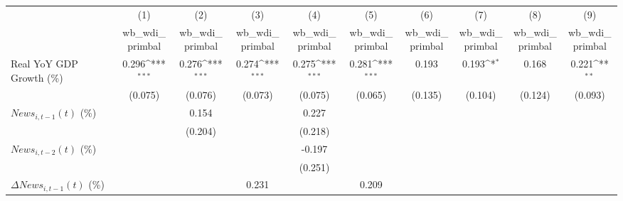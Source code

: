 {
\def\sym#1{\ifmmode^{#1}\else\(^{#1}\)\fi}
\begin{tabular}{l*{9}{c}}
\toprule
                    &\multicolumn{1}{c}{(1)}&\multicolumn{1}{c}{(2)}&\multicolumn{1}{c}{(3)}&\multicolumn{1}{c}{(4)}&\multicolumn{1}{c}{(5)}&\multicolumn{1}{c}{(6)}&\multicolumn{1}{c}{(7)}&\multicolumn{1}{c}{(8)}&\multicolumn{1}{c}{(9)}\\
                    &\multicolumn{1}{c}{wb_wdi_primbal}&\multicolumn{1}{c}{wb_wdi_primbal}&\multicolumn{1}{c}{wb_wdi_primbal}&\multicolumn{1}{c}{wb_wdi_primbal}&\multicolumn{1}{c}{wb_wdi_primbal}&\multicolumn{1}{c}{wb_wdi_primbal}&\multicolumn{1}{c}{wb_wdi_primbal}&\multicolumn{1}{c}{wb_wdi_primbal}&\multicolumn{1}{c}{wb_wdi_primbal}\\
\midrule
Real YoY GDP Growth (\%)&       0.296\sym{***}&       0.276\sym{***}&       0.274\sym{***}&       0.275\sym{***}&       0.281\sym{***}&       0.193         &       0.193\sym{*}  &       0.168         &       0.221\sym{**} \\
                    &     (0.075)         &     (0.076)         &     (0.073)         &     (0.075)         &     (0.065)         &     (0.135)         &     (0.104)         &     (0.124)         &     (0.093)         \\
\addlinespace
$ News_{i,t-1}(t)$ (\%)&                     &       0.154         &                     &       0.227         &                     &                     &                     &                     &                     \\
                    &                     &     (0.204)         &                     &     (0.218)         &                     &                     &                     &                     &                     \\
\addlinespace
$ News_{i,t-2}(t)$ (\%)&                     &                     &                     &      -0.197         &                     &                     &                     &                     &                     \\
                    &                     &                     &                     &     (0.251)         &                     &                     &                     &                     &                     \\
\addlinespace
$ \Delta News_{i,t-1}(t)$ (\%)&                     &                     &       0.231         &                     &       0.209         &                     &                     &                     &                     \\

\end{tabular}}
